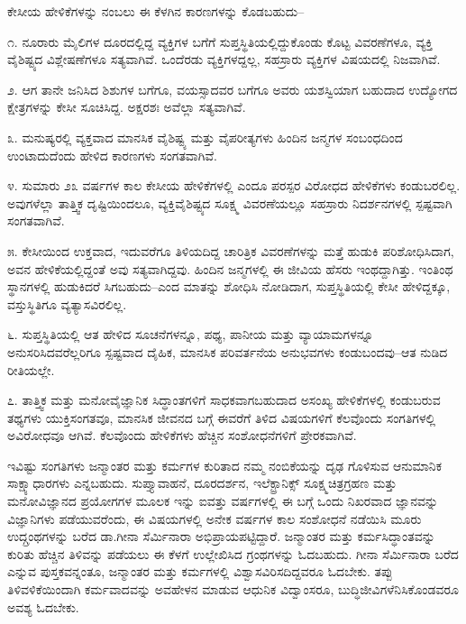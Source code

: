 ಕೇಸೀಯ ಹೇಳಿಕೆಗಳನ್ನು ನಂಬಲು ಈ ಕೆಳಗಿನ ಕಾರಣಗಳನ್ನು ಕೊಡಬಹುದು–

೧. ನೂರಾರು ಮೈಲಿಗಳ ದೂರದಲ್ಲಿದ್ದ ವ್ಯಕ್ತಿಗಳ ಬಗೆಗೆ ಸುಪ್ತಸ್ಥಿತಿಯಲ್ಲಿದ್ದುಕೊಂಡು ಕೊಟ್ಟ ವಿವರಣೆಗಳೂ, ವ್ಯಕ್ತಿ ವೈಶಿಷ್ಟ್ಯದ ವಿಶ್ಲೇಷಣೆಗಳೂ ಸತ್ಯವಾಗಿವೆ. ಒಂದೆರಡು ವ್ಯಕ್ತಿಗಳದ್ದಲ್ಲ, ಸಹಸ್ರಾರು ವ್ಯಕ್ತಿಗಳ ವಿಷಯದಲ್ಲಿ ನಿಜವಾಗಿವೆ.

೨. ಆಗ ತಾನೇ ಜನಿಸಿದ ಶಿಶುಗಳ ಬಗೆಗೂ, ವಯಸ್ಸಾದವರ ಬಗೆಗೂ ಅವರು ಯಶಸ್ವಿಯಾಗ ಬಹುದಾದ ಉದ್ಯೋಗದ ಕ್ಷೇತ್ರಗಳನ್ನು ಕೇಸೀ ಸೂಚಿಸಿದ್ದ. ಅಕ್ಷರಶಃ ಅವೆಲ್ಲಾ ಸತ್ಯವಾಗಿವೆ.

೩. ಮನುಷ್ಯರಲ್ಲಿ ವ್ಯಕ್ತವಾದ ಮಾನಸಿಕ ವೈಶಿಷ್ಟ್ಯ ಮತ್ತು ವೈಪರೀತ್ಯಗಳು ಹಿಂದಿನ ಜನ್ಮಗಳ ಸಂಬಂಧದಿಂದ ಉಂಟಾದುದೆಂದು ಹೇಳಿದ ಕಾರಣಗಳು ಸಂಗತವಾಗಿವೆ.

೪. ಸುಮಾರು ೨೩ ವರ್ಷಗಳ ಕಾಲ ಕೇಸೀಯ ಹೇಳಿಕೆಗಳಲ್ಲಿ ಎಂದೂ ಪರಸ್ಪರ ವಿರೋಧದ ಹೇಳಿಕೆಗಳು ಕಂಡುಬರಲಿಲ್ಲ. ಅವುಗಳೆಲ್ಲಾ ತಾತ್ತ್ವಿಕ ದೃಷ್ಟಿಯಿಂದಲೂ, ವ್ಯಕ್ತಿವೈಶಿಷ್ಟ್ಯದ ಸೂಕ್ಷ್ಮ ವಿವರಣೆಯಲ್ಲೂ ಸಹಸ್ರಾರು ನಿದರ್ಶನಗಳಲ್ಲಿ ಸ್ಪಷ್ಟವಾಗಿ ಸಂಗತವಾಗಿವೆ.

೫. ಕೇಸೀಯಿಂದ ಉಕ್ತವಾದ, ಇದುವರೆಗೂ ತಿಳಿಯದಿದ್ದ ಚಾರಿತ್ರಿಕ ವಿವರಣೆಗಳನ್ನು ಮತ್ತೆ ಹುಡುಕಿ ಪರಿಶೋಧಿಸಿದಾಗ, ಅವನ ಹೇಳಿಕೆಯಲ್ಲಿದ್ದಂತೆ ಅವು ಸತ್ಯವಾಗಿದ್ದವು. ಹಿಂದಿನ ಜನ್ಮಗಳಲ್ಲಿ ಈ ಜೀವಿಯ ಹೆಸರು ಇಂಥದ್ದಾಗಿತ್ತು. ಇಂತಿಂಥ ಸ್ಥಾನಗಳಲ್ಲಿ ಹುಡುಕಿದರೆ ಸಿಗಬಹುದು–ಎಂದ ಮಾತನ್ನು ಶೋಧಿಸಿ ನೋಡಿದಾಗ, ಸುಪ್ತಸ್ಥಿತಿಯಲ್ಲಿ ಕೇಸೀ ಹೇಳಿದ್ದಕ್ಕೂ, ವಸ್ತುಸ್ಥಿತಿಗೂ ವ್ಯತ್ಯಾಸವಿರಲಿಲ್ಲ.

೬. ಸುಪ್ತಸ್ಥಿತಿಯಲ್ಲಿ ಆತ ಹೇಳಿದ ಸೂಚನೆಗಳನ್ನೂ, ಪಥ್ಯ, ಪಾನೀಯ ಮತ್ತು ವ್ಯಾಯಾಮಗಳನ್ನೂ ಅನುಸರಿಸಿದವರೆಲ್ಲರಿಗೂ ಸ್ಪಷ್ಟವಾದ ದೈಹಿಕ, ಮಾನಸಿಕ ಪರಿವರ್ತನೆಯ ಅನುಭವಗಳು ಕಂಡುಬಂದವು–ಆತ ನುಡಿದ ರೀತಿಯಲ್ಲೇ.

೭. ತಾತ್ತ್ವಿಕ ಮತ್ತು ಮನೋವೈಜ್ಞಾನಿಕ ಸಿದ್ಧಾಂತಗಳಿಗೆ ಸಾಧಕವಾಗಬಹುದಾದ ಅಸಂಖ್ಯ ಹೇಳಿಕೆಗಳಲ್ಲಿ ಕಂಡುಬರುವ ತಥ್ಯಗಳು ಯುಕ್ತಿಸಂಗತವೂ, ಮಾನಸಿಕ ಜೀವನದ ಬಗ್ಗೆ ಈವರೆಗೆ ತಿಳಿದ ವಿಷಯಗಳಿಗೆ ಕೆಲವೊಂದು ಸಂಗತಿಗಳಲ್ಲಿ ಅವಿರೋಧವೂ ಆಗಿವೆ. ಕೆಲವೊಂದು ಹೇಳಿಕೆಗಳು ಹೆಚ್ಚಿನ ಸಂಶೋಧನೆಗಳಿಗೆ ಪ್ರೇರಕವಾಗಿವೆ.

ಇವಿಷ್ಟು ಸಂಗತಿಗಳು ಜನ್ಮಾಂತರ ಮತ್ತು ಕರ್ಮಗಳ ಕುರಿತಾದ ನಮ್ಮ ನಂಬಿಕೆಯನ್ನು ದೃಢ ಗೊಳಿಸುವ ಆನುಮಾನಿಕ ಸಾಕ್ಷ್ಯಾಧಾರಗಳು  ಎನ್ನಬಹುದು. ಸುಪ್ತ್ಯಾವಾಹನೆ, ದೂರದರ್ಶನ, ಇಲೆಕ್ಟ್ರಾನಿಕ್ಸ್ ಸೂಕ್ಷ್ಮಚಿತ್ರಗ್ರಹಣ ಮತ್ತು ಮನೋವಿಜ್ಞಾನದ ಪ್ರಯೋಗಗಳ ಮೂಲಕ ಇನ್ನು ಐವತ್ತು ವರ್ಷಗಳಲ್ಲಿ ಈ ಬಗ್ಗೆ ಒಂದು ನಿಖರವಾದ ಜ್ಞಾನವನ್ನು ವಿಜ್ಞಾನಿಗಳು ಪಡೆಯುವರೆಂದು, ಈ ವಿಷಯಗಳಲ್ಲಿ ಅನೇಕ ವರ್ಷಗಳ ಕಾಲ ಸಂಶೋಧನೆ ನಡೆಯಿಸಿ ಮೂರು ಉದ್ಗ್ರಂಥಗಳನ್ನು ಬರೆದ ಡಾ.ಗೀನಾ ಸೆರ್ಮಿನಾರಾ ಅಭಿಪ್ರಾಯಪಟ್ಟಿದ್ದಾರೆ. ಜನ್ಮಾಂತರ ಮತ್ತು ಕರ್ಮಸಿದ್ಧಾಂತವನ್ನು ಕುರಿತು ಹೆಚ್ಚಿನ ತಿಳಿವನ್ನು ಪಡೆಯಲು ಈ ಕೆಳಗೆ ಉಲ್ಲೇಖಿಸಿದ ಗ್ರಂಥಗಳನ್ನು ಓದಬಹುದು. ಗೀನಾ ಸೆರ್ಮಿನಾರಾ ಬರೆದ  ಎನ್ನುವ ಪುಸ್ತಕವನ್ನಂತೂ, ಜನ್ಮಾಂತರ ಮತ್ತು ಕರ್ಮಗಳಲ್ಲಿ ವಿಶ್ವಾಸವಿರಿಸದಿದ್ದವರೂ ಓದಬೇಕು. ತಪ್ಪು ತಿಳಿವಳಿಕೆಯಿಂದಾಗಿ ಕರ್ಮವಾದವನ್ನು ಅವಹೇಳನ ಮಾಡುವ ಆಧುನಿಕ ವಿದ್ವಾಂಸರೂ, ಬುದ್ಧಿಜೀವಿಗಳೆನಿಸಿಕೊಂಡವರೂ ಅವಶ್ಯ ಓದಬೇಕು.


